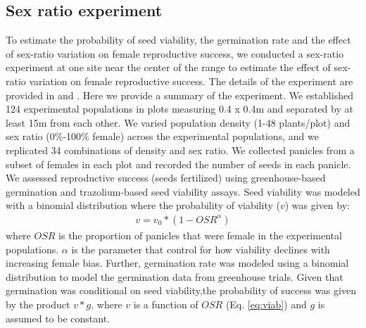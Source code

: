 \documentclass[12pt]{article}\usepackage[]{graphicx}\usepackage[dvipsnames]{xcolor}
\begin{document}
\subsection*{Sex ratio experiment}
\label{sec:experiment}
To estimate the probability of seed viability,  the germination rate and the effect of sex-ratio variation on female reproductive success, we conducted a sex-ratio experiment at one site near the center of the range to estimate the effect of sex-ratio variation on female reproductive success.
The details of the experiment are provided in \cite{compagnoni2017can} and \cite{miller2022two}.
Here we provide a summary of the experiment.
We established 124 experimental populations in plots measuring 0.4 x 0.4m and separated by at least 15m from each other.
We varied population density (1-48 plants/plot) and sex ratio (0\%-100\% female) across the experimental populations, and we replicated 34 combinations of density and sex ratio.
We collected panicles from a subset of females in each plot and recorded the number of seeds in each panicle.
We assessed reproductive success (seeds fertilized) using greenhouse-based germination and trazolium-based seed viability assays.
Seed viability was modeled with a binomial distribution where the probability of viability ($v$) was given by:
\begin{align}\label{eq:viab}
v = v_{0} * (1 - OSR^{\alpha})
\end{align}
\noindent where $OSR$ is the proportion of panicles that were female in the experimental populations.
$\alpha$ is the parameter that control for how viability declines with increasing female bias.
Further, germination rate was modeled using a binomial distribution to model the germination data from greenhouse trials.
Given that germination was conditional on seed viability,the probability of success was given by the product $v*g$, where $v$ is a function of $OSR$ (Eq. \ref{eq:viab}) and $g$ is assumed to be constant.
\end{document}

